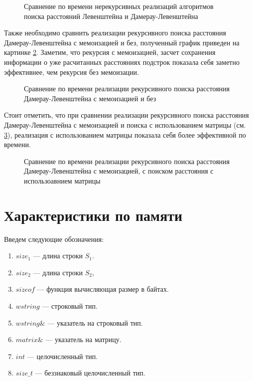 \begin{figure}[H]
	\centering
	
	\caption{Сравнение по времени нерекурсивных реализаций алгоритмов поиска расстояний Левенштейна и Дамерау-Левенштейна}
	\label{plt:time_matrix_cmp}
\end{figure}

Также необходимо сравнить реализации рекурсивного поиска расстояния Дамерау-Левенштейна с мемоизацией и без, полученный график приведен
на картинке \ref{plt:time_rec_cmp}. Заметим, что рекурсия с мемоизацией, засчет сохранения информации о уже расчитанных расстояниях подстрок
показала себя заметно эффективнее, чем рекурсия без мемоизации. 


\begin{figure}[H]
	\centering
	
	\caption{Сравнение по времени реализации рекурсивного поиска расстояния Дамерау-Левенштейна с мемоизацией и без}
	\label{plt:time_rec_cmp}
\end{figure}

Стоит отметить, что при сравнении реализации рекурсивного поиска расстояния Дамерау-Левенштейна с  мемоизацией и поиска
с использованием матрицы (см. \ref{plt:time_mat_rec_cmp}), реализация с использованием матрицы показала себя более эффективной
по времени. 

\begin{figure}[H]
	\centering
	
	\caption{Сравнение по времени реализации рекурсивного поиска расстояния Дамерау-Левенштейна с  мемоизацией, с поиском
	расстояния с использоавнием матрицы}
	\label{plt:time_mat_rec_cmp}
\end{figure}


\section{Характеристики по памяти}

Введем следующие обозначения:
\begin{enumerate}
	\item $size_{1}$ --- длина строки $S_{1}$.
	\item $size_{2}$ --- длина строки $S_{2}$,
	\item $sizeof$ --- функция вычисляющая размер в байтах.
	\item $wstring$ --- строковый тип.
	\item $wstring\&$ --- указатель на строковый тип.
	\item $matrix\&$ --- указатель на матрицу.
	\item $int$ --- целочисленный тип.
	\item $size\_t$ --- беззнаковый целочисленный тип.
\end{enumerate}

